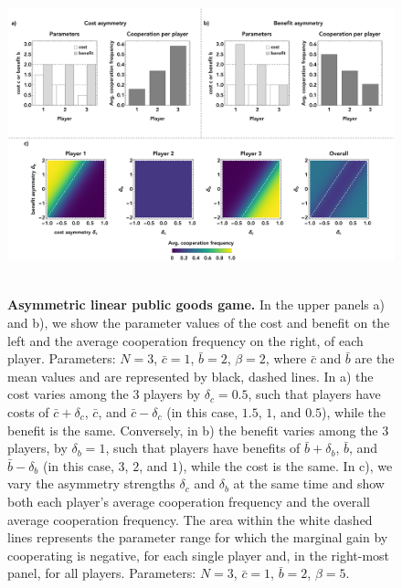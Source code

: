 \documentclass[11pt]{article}
\theoremstyle{plainCl1}
\theoremstyle{plainCl2}
\begin{document}
\begin{figure}
\centering
\includegraphics[width =  \textwidth]{figures/figure2.eps}~\\[0.4cm]
\caption{\onehalfspacing
\textbf{Asymmetric linear public goods game.} In the upper panels a) and b), we show the parameter values of the cost and benefit on the left and the average cooperation frequency on the right, of each player. Parameters: $N=3$, $\bar{c} = 1$, $\bar{b} = 2$, $\beta = 2$, where $\bar{c}$ and $\bar{b}$ are the mean values and are represented by black, dashed lines. In a) the cost varies among the 3 players by $\delta_c = 0.5$, such that players have costs of $\bar{c} + \delta_c $, $\bar{c}$, and $\bar{c} - \delta_c$ (in this case, $1.5$, $1$, and $0.5$), while the benefit is the same. Conversely, in b) the benefit varies among the 3 players, by $\delta_b = 1$, such that players have benefits of $\bar{b} + \delta_b $, $\bar{b}$, and $\bar{b} - \delta_b$ (in this case, $3$, $2$, and $1$), while the cost is the same. In c), we vary the asymmetry strengths $\delta_c $ and $\delta_b$ at the same time and show both each player’s average cooperation frequency and the overall average cooperation frequency. The area within the white dashed lines represents the parameter range for which the marginal gain by cooperating is negative, for each single player and, in the right-most panel, for all players. Parameters: $N=3$, $\bar{c} = 1$, $\bar{b} = 2$, $\beta = 5$.
}
\label{Fig:LPGG-asymmetric}
\end{figure}
\end{document}
